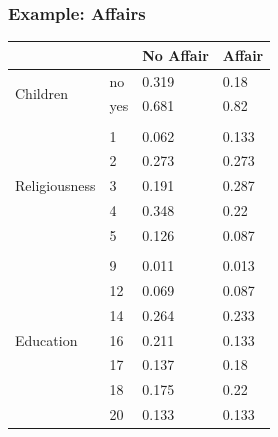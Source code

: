 \documentclass{beamer}
\newcommand{\1}{\mathbb{1}}
\begin{document}
\begin{frame}\frametitle{Example: Affairs}
{\tiny
\begin{table}[ht]
\centering
\begin{tabular}{llll}
  \toprule 
 & & No Affair & Affair \\ \hline \hline 
 \multirow{2}{*}{Children} & no & 0.319 & 0.18 \\ 
     & yes & 0.681 & 0.82 \\ \\
  \multirow{5}{*}{Religiousness} & 1 & 0.062 & 0.133 \\ 
    & 2 & 0.273 & 0.273 \\ 
    & 3 & 0.191 & 0.287 \\ 
    & 4 & 0.348 & 0.22 \\ 
    & 5 & 0.126 & 0.087 \\ \\
  \multirow{7}{*}{Education} & 9 & 0.011 & 0.013 \\ 
    & 12 & 0.069 & 0.087 \\ 
    & 14 & 0.264 & 0.233 \\ 
    & 16 & 0.211 & 0.133 \\ 
    & 17 & 0.137 & 0.18 \\ 
    & 18 & 0.175 & 0.22 \\ 
    & 20 & 0.133 & 0.133 \\ 
   \bottomrule 
\end{tabular}
\end{table}
} 
\end{frame}

\end{document}
